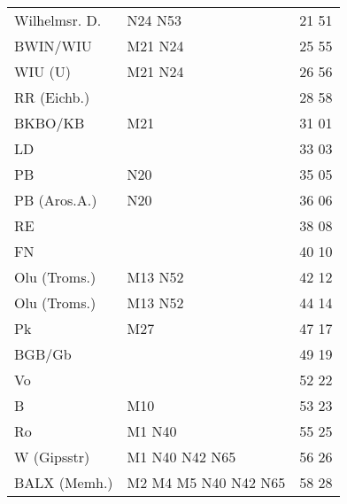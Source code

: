 \begin{tabular}{!{\color{schiefergrau}\vrule width 3pt}*{3}{l!{\color{schiefergrau}\vrule width 3pt}}}
\hline
{}
 \\
\hline
Wilhelmsr. D.& \nbus{} N24 N53                                            & 21 51 \\
BWIN/WIU     & \mbus{} M21 \nbus{} N24                                    & 25 55 \\
WIU (U)      & \mbus{} M21 \nbus{} N24                                    & 26 56 \\
RR (Eichb.)  &                                                            & 28 58 \\
BKBO/KB      & \mbus{} M21                                                & 31 01 \\
LD           &                                                            & 33 03 \\
PB           & \nbus{} N20                                                & 35 05 \\
PB (Aros.A.) & \nbus{} N20                                                & 36 06 \\
RE           &                                                            & 38 08 \\
FN           &                                                            & 40 10 \\
Olu (Troms.) & \nuneun{} \mtram{} M13 \nbus{} N52                         & 42 12 \\
\hline
Olu (Troms.) & \nuneun{} \mtram{} M13 \nbus{} N52                         & 44 14 \\
Pk           & \mbus{} M27                                                & 47 17 \\
BGB/Gb       &                                                            & 49 19 \\
Vo           &                                                            & 52 22 \\
B            & \mtram{} M10                                               & 53 23 \\
Ro           & \mtram{} M1 \nbus{} N40                                    & 55 25 \\
W (Gipsstr)  & \mtram{} M1 \nbus{} N40 N42 N65                            & 56 26 \\
BALX (Memh.) & \nuzwei{} \nufuenf{} \mtram{} M2 M4 M5 \nbus{} N40 N42 N65 & 58 28 \\

\end{tabular}
